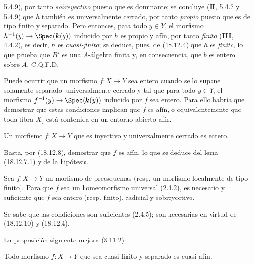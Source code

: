 
5.4.9), por tanto \emph{sobreyectivo} puesto que es dominante; se concluye (\textbf{II}, 5.4.3 y 5.4.9) que $h$ también es universalmente cerrado, por tanto \emph{propio} puesto que es de tipo finito y separado. Pero entonces, para todo $y\in Y$, el morfismo $h^{-1}(y)\to\Spec(\boldsymbol k(y))$ inducido por $h$ es propio y afín, por tanto \emph{finito} (\textbf{III}, 4.4.2), es decir, $h$ es \emph{cuasi-finito}; se deduce, pues, de (18.12.4) que $h$ es \emph{finito}, lo que prueba que $B'$ es una $A$-álgebra finita y, en consecuencia, que $b$ es entero sobre $A$. C.Q.F.D.

\begin{remark}[18.12.9]
\label{IV.18.12.9}
Puede ocurrir que un morfismo $f:X\to Y$ sea entero cuando se lo supone solamente separado, universalmente cerrado y tal que para todo $y\in Y$, el morfismo $f^{-1}(y)\to\Spec(\boldsymbol k(y))$ inducido por $f$ sea entero. Para ello habría que demostrar que estas condiciones implican que $f$ es afín, o equivalentemente que toda fibra $X_y$ está contenida en un entorno abierto afín.
\end{remark}

\begin{corollary}[18.12.10]
\label{IV.18.12.10}
Un morfismo $f:X\to Y$ que es inyectivo y universalmente cerrado es entero.
\end{corollary}

Basta, por (18.12.8), demostrar que $f$ es afín, lo que se deduce del lema (18.12.7.1) y de la hipótesis.

\begin{corollary}[18.12.11]
\label{IV.18.12.11}
Sea $f:X\to Y$ un morfismo de preesquemas \textup{(resp.} un morfismo localmente de tipo finito\textup{)}. Para que $f$ sea un homeomorfismo universal \textup{(2.4.2)}, es necesario y suficiente que $f$ sea entero \textup{(resp.} finito\textup{)}, radicial y sobreyectivo.
\end{corollary}

Se sabe que las condiciones son suficientes (2.4.5); son necesarias en virtud de (18.12.10) y (18.12.4).

La proposición siguiente mejora (8.11.2):

\begin{proposition}[18.12.12]
\label{IV.18.12.12}
Todo morfismo $f:X\to Y$ que sea cuasi-finito y separado es cuasi-afín.
\end{proposition}

